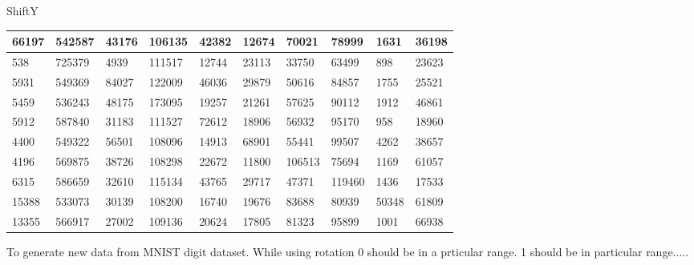  ShiftY
\begin{table}
\begin{tabular}{|l|l|l|l|l|l|l|l|l|l|}
\hline
66197 & 542587 & 43176 & 106135 & 42382 & 12674 & 70021 & 78999 & 1631 & 36198 \\ \hline
538 & 725379 & 4939 & 111517 & 12744 & 23113 & 33750 & 63499 & 898 & 23623 \\ \hline
5931 & 549369 & 84027 & 122009 & 46036 & 29879 & 50616 & 84857 & 1755 & 25521 \\ \hline
5459 & 536243 & 48175 & 173095 & 19257 & 21261 & 57625 & 90112 & 1912 & 46861 \\ \hline
5912 & 587840 & 31183 & 111527 & 72612 & 18906 & 56932 & 95170 & 958 & 18960 \\ \hline
4400 & 549322 & 56501 & 108096 & 14913 & 68901 & 55441 & 99507 & 4262 & 38657 \\ \hline
4196 & 569875 & 38726 & 108298 & 22672 & 11800 & 106513 & 75694 & 1169 & 61057 \\ \hline
6315 & 586659 & 32610 & 115134 & 43765 & 29717 & 47371 & 119460 & 1436 & 17533 \\ \hline
15388 & 533073 & 30139 & 108200 & 16740 & 19676 & 83688 & 80939 & 50348 & 61809 \\ \hline
13355 & 566917 & 27002 & 109136 & 20624 & 17805 & 81323 & 95899 & 1001 & 66938 \\ \hline
\end{tabular}
\end{table}     

\fi

\clearpage

To generate new data from MNIST digit dataset. While using rotation 0 should be in a prticular range. 1 should be in particular range.....